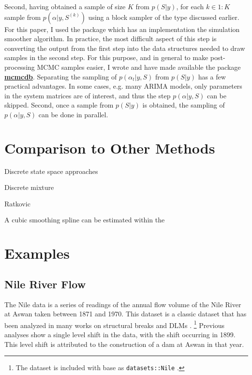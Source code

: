 \documentclass{article}
\begin{document}
Second, having obtained a sample of size $K$ from $p(S | y)$, for each $k \in 1:K$ sample from $p(\alpha | y, S^{(k)})$ using a block sampler of the type discussed earlier.
For this paper, I used the \RLang{} package  \parencite{Helske2012} which has an implementation the \textcite{DurbinKoopman2002} simulation smoother algorithm.
In practice, the most difficult aspect of this step is converting the output from the first step into the data structures needed to draw samples in the second step.
For this purpose, and in general to make post-processing MCMC samples easier, I wrote and have made available the \RLang{} package \href{https://github.com/jrnold/mcmcdb}{\textbf{mcmcdb}}.
Separating the sampling of $p(\alpha_{t} | y, S)$ from $p(S | y)$ has a few practical advantages.
In some cases, e.g. many ARIMA models, only parameters in the system matrices are of interest, and thus the step $p(\alpha | y, S)$ can be skipped.
Second, once a sample from $p(S | y)$ is obtained, the sampling of $p(\alpha | y, S)$ can be done in parallel.

\section{Comparison to Other Methods}
\label{sec:comp-other-meth}

Discrete state space approaches

Discrete mixture

Ratkovic

A cubic smoothing spline can be estimated within the 

 

\section{Examples}
\label{sec:examples}

\subsection{Nile River Flow}
\label{sec:nile}

The Nile data is a series of readings of the annual flow volume of the Nile River at Aswan taken between 1871 and 1970.
This dataset is a classic dataset that has been analyzed in many works on structural breaks and DLMs \parencites{Cobb1978}{Balke1993}{JongPenzer1998}{DurbinKoopman2001}{CommandeurKoopmanOoms2011}.%
\footnote{The dataset is included with base \RLang{} as \texttt{datasets::Nile} \parencite{RCT2013}.}
Previous analyses show a single level shift in the data, with the shift occurring in 1899.
This level shift is attributed to the construction of a dam at Aswan in that year.
\end{document}
